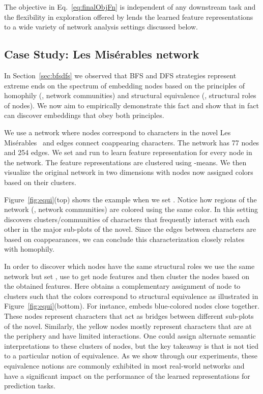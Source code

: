 

The objective in Eq.~\ref{eq:finalObjFn} is independent of any downstream task and the flexibility in exploration offered by \nodevec lends the learned feature representations to a wide variety of network analysis settings discussed below.

\subsection{Case Study: Les Mis\'{e}rables network}

In Section~\ref{sec:bfsdfs} we observed that BFS and DFS strategies represent extreme ends on the spectrum of embedding nodes based on the principles of homophily (\ie, network communities) and structural equivalence (\ie, structural roles of nodes). We now aim to empirically demonstrate this fact and show that \nodevec in fact can discover embeddings that obey both principles.

We use a network where nodes correspond to characters in the novel Les Mis\'{e}rables~\cite{knuth-1993} and edges connect coappearing characters. The network has 77 nodes and 254 edges. We set  and run \nodevec to learn feature representation for every node in the network. The feature representations are clustered using -means. We then visualize the original network in two dimensions with nodes now assigned colors based on their clusters.



Figure~\ref{fig:equi}(top) shows the example when we set . Notice how regions of the network (\ie, network communities) are colored using the same color. In this setting \nodevec discovers clusters/communities of characters that frequently interact with each other in the major sub-plots of the novel. Since the edges between characters are based on coappearances, we can conclude this characterization closely relates with homophily. 

In order to discover which nodes have the same structural roles we use the same network but set , use \nodevec to get node features and then cluster the nodes based on the obtained features. Here \nodevec obtains a complementary assignment of node to clusters such that the colors correspond to structural equivalence as illustrated in Figure~\ref{fig:equi}(bottom). For instance, \nodevec embeds blue-colored nodes close together. These nodes represent characters that act as bridges between different sub-plots of the novel. Similarly, the yellow nodes mostly represent characters that are at the periphery and have limited interactions. 
One could assign alternate semantic interpretations to these clusters of nodes, but the key takeaway is that \nodevec is not tied to a particular notion of equivalence. As we show through our experiments, these equivalence notions are commonly exhibited in most real-world networks and have a significant impact on the performance of the learned representations for prediction tasks.


